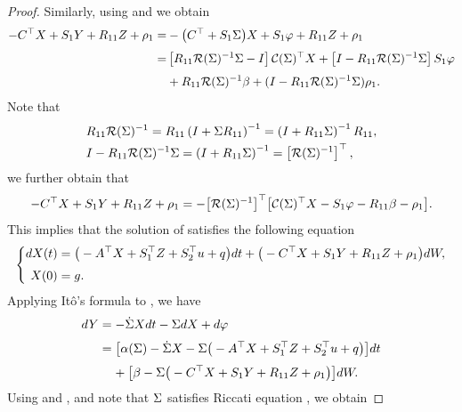 \documentclass[11pt,times,twoside]{article}
\def\tb{\textcolor{blue}} \def\ae{\hbox{\rm a.e.}}           \def\({\Big (}
\def\ba{\begin{aligned}}              \def\ea{\end{aligned}}
\begin{document}
\begin{proof}
%
Similarly, using  and  we obtain
%
\begin{equation*}\begin{aligned}
%
\ds -C^{\top} X+S_{1} Y+R_{11} Z +\rho_1
=&-\big(C^{\top}+S_{1} \Si\big) X+S_{1} \varphi+R_{11} Z+\rho_1 \\
%
%
\ns\ds =&\left[R_{11} \mathcal{R}(\Si)^{-1} \Si-I\right] \mathcal{C}(\Si)^{\top} X+\left[I-R_{11} \mathcal{R}(\Si)^{-1} \Si\right] S_{1} \varphi \\
%
\ns\ds &+R_{11} \mathcal{R}(\Si)^{-1} \beta  +(I-R_{11} \mathcal{R}(\Si)^{-1}\Si)\rho_1.
\end{aligned}\end{equation*}
%
Note that
%
\begin{equation*}
\begin{array}{l}
\ds R_{11} \mathcal{R}(\Si)^{-1}=R_{11}\left(I+\Si R_{11}\right)^{-1}
=\left(I+R_{11} \Si\right)^{-1} R_{11}, \\
%
\ns\ds I-R_{11} \mathcal{R}(\Si)^{-1} \Si=\left(I+R_{11} \Si\right)^{-1}=\left[\mathcal{R}(\Si)^{-1}\right]^{\top},
%
\end{array}
\end{equation*}
%
we further obtain that
%
\begin{equation}\label{4.10}
-C^{\top} X+S_{1} Y+R_{11} Z  +\rho_1 =
-\big[\mathcal{R}(\Sigma)^{-1}\big]^{\top}\big[\mathcal{C}(\Sigma)^{\top} X-S_{1} \varphi-R_{11}\beta -\rho_1\big].
\end{equation}
%
This implies that the solution of  satisfies the following equation
%
\begin{equation}\label{4.11}\left\{\ba
\ds d X(t) &= \big(-A^{\top} X+S_{1}^{\top} Z+S_{2}^{\top} u +q\big) d t+\big(-C^{\top} X+S_{1} Y+R_{11} Z +\rho_1\big) d W, \\
\ns\ds X(0) &= g.
\ea\right.
\end{equation}
%
Applying It\^{o}'s formula to , we have
%
$$\begin{aligned}
%
\ds dY &=-\dot{\Si} X d t-\Si d X+d \varphi \\
%
\ns\ds &=\big[\alpha(\Si)-\dot{\Si} X-\Si \big(-A^{\top} X+S_{1}^{\top} Z+S_{2}^{\top} u +q \big)\big] d t\\
%
\ns\ds &\hp{=\ } +\big[\beta-\Si\big(-C^{\top} X+S_{1} Y+R_{11} Z +\rho_1 \big)\big] d W.
%
\end{aligned}$$
%
Using  and , and note that $\Sigma$ satisfies Riccati equation , we obtain

\end{proof}
\end{document}
